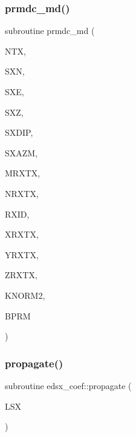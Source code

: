 \mbox{\label{Leroi__c_8f90_a2212318f6dd3a1fda873532ddfb09348}} 
\subsubsection{\texorpdfstring{prmdc\+\_\+md()}{prmdc\_md()}}
{\footnotesize\ttfamily subroutine prmdc\+\_\+md (\begin{DoxyParamCaption}\item[{integer}]{N\+TX,  }\item[{real, dimension (1,ntx)}]{S\+XN,  }\item[{real, dimension (1,ntx)}]{S\+XE,  }\item[{real, dimension (ntx)}]{S\+XZ,  }\item[{real, dimension (ntx)}]{S\+X\+D\+IP,  }\item[{real, dimension (ntx)}]{S\+X\+A\+ZM,  }\item[{integer}]{M\+R\+X\+TX,  }\item[{integer, dimension(ntx)}]{N\+R\+X\+TX,  }\item[{integer, dimension(mrxtx,ntx)}]{R\+X\+ID,  }\item[{real, dimension (mrxtx,ntx,1)}]{X\+R\+X\+TX,  }\item[{real, dimension (mrxtx,ntx,1)}]{Y\+R\+X\+TX,  }\item[{real, dimension(mrxtx,ntx)}]{Z\+R\+X\+TX,  }\item[{integer, dimension(mrxtx,ntx)}]{K\+N\+O\+R\+M2,  }\item[{real, dimension(mrxtx,ntx)}]{B\+P\+RM }\end{DoxyParamCaption})}

\mbox{\label{Leroi__c_8f90_a5b285692f676003c1a8cae9c7a8017ee}} 
\subsubsection{\texorpdfstring{propagate()}{propagate()}}
{\footnotesize\ttfamily subroutine edsx\+\_\+coef\+::propagate (\begin{DoxyParamCaption}\item[{integer}]{L\+SX }\end{DoxyParamCaption})}

